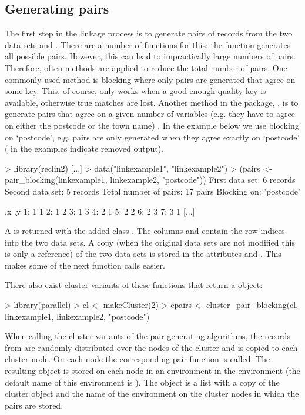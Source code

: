 \subsection{Generating pairs}

The first step in the linkage process is to generate pairs of records from the two data sets
 and . There are a number of functions for this: the function  generates
all possible pairs. However, this can lead to impractically large numbers of pairs. Therefore, often
methods are applied to reduce the total number of pairs. One commonly used method is blocking where
only pairs are generated that agree on some key. This, of course, only works when a good enough
quality key is available, otherwise true matches are lost.  Another method in the package,
, is to generate pairs that agree on a given number of variables (e.g. they have
to agree on either the postcode or the town name) \citep{datamatching}. In the example below we use
blocking on `postcode', e.g. pairs are only generated when they agree exactly on `postcode'
(\code{[...]} in the examples indicate removed output).

\begin{example}
> library(reclin2)
[...]
> data("linkexample1", "linkexample2")
> (pairs <- pair_blocking(linkexample1, linkexample2, "postcode"))
  First data set:  6 records
  Second data set: 5 records
  Total number of pairs: 17 pairs
  Blocking on: 'postcode'

    .x .y
 1:  1  1
 2:  1  2
 3:  1  3
 4:  2  1
 5:  2  2
 6:  2  3
 7:  3  1
[...]
\end{example}
A  is returned with the added class . The columns  and
 contain the row indices into the two data sets. A copy (when the original data sets are
not modified this is only a reference) of the two data sets is stored in the attributes  and
. This makes some of the next function calls easier. 

There also exist cluster variants of these functions that return a  object:
\begin{example}
> library(parallel)
> cl <- makeCluster(2)
> cpairs <- cluster_pair_blocking(cl, linkexample1, linkexample2, "postcode")
\end{example}
When calling the cluster variants of the pair generating algorithms, the records from  are
randomly distributed over the nodes of the cluster and  is copied to each cluster node. On
each node the corresponding pair function is called. The resulting  object is stored on
each node in an environment in the environment  (the default name of
this environment is ).  The  object is a list with a copy of
the cluster object and the name of the environment on the cluster nodes in which the pairs are
stored.


